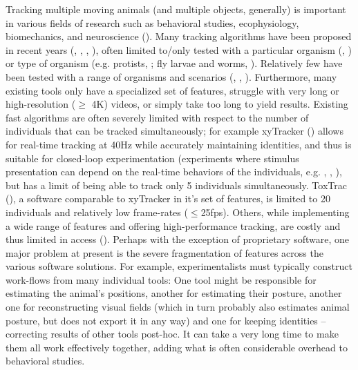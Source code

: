 \documentclass[9pt,lineno]{elife}
\begin{document}
Tracking multiple moving animals (and multiple objects, generally) is important in various fields of research such as behavioral studies, ecophysiology, biomechanics, and neuroscience (\cite{dell2014automated}). Many tracking algorithms have been proposed in recent years (\cite{ohayon2013automated}, \cite{fukunaga2015grouptracker}, \cite{burgos2012social}, \cite{rasch2016closing}), often limited to/only tested with a particular organism (\cite{hewitt2018novel}, \cite{branson2009high}) or type of organism (e.g. protists, \cite{pennekamp2015bemovi}; fly larvae and worms, \cite{risse2017fimtrack}). Relatively few have been tested with a range of organisms and scenarios (\cite{idtracker}, \cite{sridhar2019tracktor}, \cite{rodriguez2018toxtrac}). Furthermore, many existing tools only have a specialized set of features, struggle with very long or high-resolution ($\ge$ 4K) videos, or simply take too long to yield results. Existing fast algorithms are often severely limited with respect to the number of individuals that can be tracked simultaneously; for example xyTracker (\cite{rasch2016closing}) allows for real-time tracking at 40Hz while accurately maintaining identities, and thus is suitable for closed-loop experimentation (experiments where stimulus presentation can depend on the real-time behaviors of the individuals, e.g. \cite{bath2014flymad}, \cite{brembs2000operant}, \cite{bianco2015visuomotor}), but has a limit of being able to track only 5 individuals simultaneously. ToxTrac (\cite{rodriguez2018toxtrac}), a software comparable to xyTracker in it's set of features, is limited to 20 individuals and relatively low frame-rates ($\leq$25fps). Others, while implementing a wide range of features and offering high-performance tracking, are costly and thus limited in access (\cite{noldus2001ethovision}). Perhaps with the exception of proprietary software, one major problem at present is the severe fragmentation of features across the various software solutions. For example, experimentalists must typically construct work-flows from many individual tools: One tool might be responsible for estimating the animal's positions, another for estimating their posture, another one for reconstructing visual fields (which in turn probably also estimates animal posture, but does not export it in any way) and one for keeping identities -- correcting results of other tools post-hoc. It can take a very long time to make them all work effectively together, adding what is often considerable overhead to behavioral studies.
\end{document}
